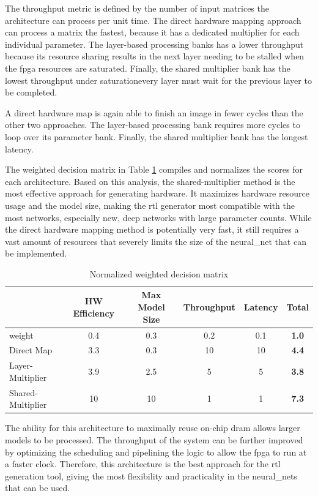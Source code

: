 \documentclass{uw-ece-wkrpt}
\begin{document}
The throughput metric is defined by the number of input matrices the architecture can process per unit time. The direct hardware mapping approach can process a matrix the fastest, because it has a dedicated multiplier for each individual parameter. The layer-based processing banks has a lower throughput because its resource sharing results in the next layer needing to be stalled when the \gls{fpga} resources are saturated. Finally, the shared multiplier bank has the lowest throughput under saturation\textemdash{}every layer must wait for the previous layer to be completed.

A direct hardware map is again able to finish an image in fewer cycles than the other two approaches. The layer-based processing bank requires more cycles to loop over its parameter bank. Finally, the shared multiplier bank has the longest latency.

The weighted decision matrix in Table \ref{tab:decision_matrix} compiles and normalizes the scores for each architecture. Based on this analysis, the shared-multiplier method is the most effective approach for generating hardware. It maximizes hardware resource usage and the model size, making the \gls{rtl} generator most compatible with the most networks, especially new, deep networks with large parameter counts. While the direct hardware mapping method is potentially very fast, it still requires a vast amount of resources that severely limits the size of the \gls{neural_net} that can be implemented.

\begin{table}
\centering
\caption{Normalized weighted decision matrix}\label{tab:decision_matrix}
\begin{tabular}{lccccc}
\toprule
& HW Efficiency & Max Model Size & Throughput & Latency & \textbf{Total} \\
\midrule
\Gls{weight}            & 0.4           & 0.3            & 0.2        & 0.1     & \textbf{1.0} \\
Direct Map        & 3.3           & 0.3            & 10         & 10      & \textbf{4.4} \\
Layer-Multiplier  & 3.9           & 2.5            & 5          & 5       & \textbf{3.8} \\
Shared-Multiplier & 10            & 10             & 1          & 1       & \textbf{7.3} \\
\bottomrule
\end{tabular}
\end{table}

The ability for this architecture to maximally reuse on-chip \gls{dram} allows larger models to be processed. The throughput of the system can be further improved by optimizing the scheduling and pipelining the logic to allow the \gls{fpga} to run at a faster clock.  Therefore, this architecture is the best approach for the \gls{rtl} generation tool, giving the most flexibility and practicality in the \glspl{neural_net} that can be used.
\end{document}
